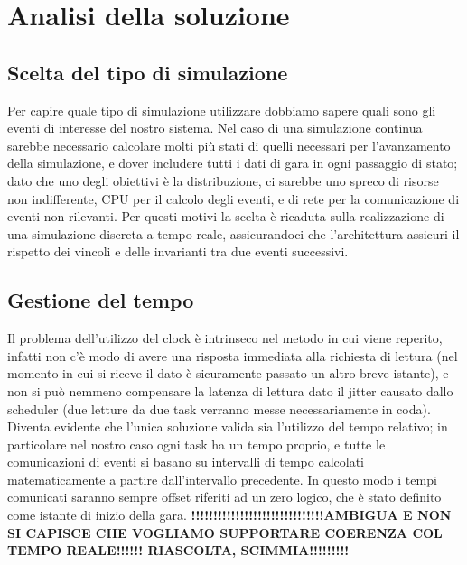 \chapter{Analisi della soluzione} %

\label{Chapter3} %


\section{Scelta del tipo di simulazione}
Per capire quale tipo di simulazione utilizzare dobbiamo sapere quali sono gli eventi di interesse del nostro sistema.
Nel caso di una simulazione continua sarebbe necessario calcolare molti più stati di quelli necessari per l’avanzamento della simulazione, e dover includere tutti i dati di gara in ogni passaggio di stato; dato che uno degli obiettivi è la distribuzione, ci sarebbe uno spreco di risorse non indifferente, CPU per il calcolo degli eventi, e di rete per la comunicazione di eventi non rilevanti.
Per questi motivi la scelta è ricaduta sulla realizzazione di una simulazione discreta a tempo reale, assicurandoci che l’architettura assicuri il rispetto dei vincoli e delle invarianti tra due eventi successivi.

\section{Gestione del tempo}
Il problema dell’utilizzo del clock è intrinseco nel metodo in cui viene reperito, infatti non c’è modo di avere una risposta immediata alla richiesta di lettura (nel momento in cui si riceve il dato è sicuramente passato un altro breve istante), e non si può nemmeno compensare la latenza di lettura dato il jitter causato dallo scheduler (due letture da due task verranno messe necessariamente in coda).
Diventa evidente che l’unica soluzione valida sia l’utilizzo del tempo relativo; in particolare nel nostro caso ogni task ha un tempo proprio, e tutte le comunicazioni di eventi si basano su intervalli di tempo calcolati matematicamente a partire dall’intervallo precedente. In questo modo i tempi comunicati saranno sempre offset riferiti ad un zero logico, che è stato definito come istante di inizio della gara.
\textbf{!!!!!!!!!!!!!!!!!!!!!!!!!!!!!!AMBIGUA E NON SI CAPISCE CHE VOGLIAMO SUPPORTARE COERENZA COL TEMPO REALE!!!!!! RIASCOLTA, SCIMMIA!!!!!!!!!}

